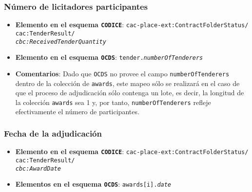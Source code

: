         \subsubsection{Número de licitadores participantes}
            \begin{itemize}
                \item \textbf{Elemento en el esquema \texttt{CODICE}}:
                    \tabto{7.6cm} \texttt{cac-place-ext:ContractFolderStatus/} \\
                    \tabto{7.6cm} \texttt{cac:TenderResult/} \\
                    \tabto{7.6cm} \texttt{\textit{cbc:ReceivedTenderQuantity}}
                \item \textbf{Elemento en el esquema \texttt{OCDS}}:
                    \tabto{7.6cm} \texttt{tender.\textit{numberOfTenderers}}
                \item \textbf{Comentarios}: Dado que \texttt{OCDS} no provee el campo \texttt{numberOfTenderers} dentro de la colección de \texttt{awards}, este mapeo sólo se realizará en el caso de que el proceso de adjudicación sólo contenga un lote, es decir, la longitud de la colección \texttt{awards} sea 1 y, por tanto, \texttt{numberOfTenderers} refleje efectivamente el número de participantes.
            \end{itemize}
            
        \subsubsection{Fecha de la adjudicación}
            \begin{itemize}
                \item \textbf{Elemento en el esquema \texttt{CODICE}}:
                    \tabto{7.6cm} \texttt{cac-place-ext:ContractFolderStatus/} \\
                    \tabto{7.6cm} \texttt{cac:TenderResult/} \\
                    \tabto{7.6cm} \texttt{\textit{cbc:AwardDate}}
                \item \textbf{Elementos en el esquema \texttt{OCDS}}:
                    \tabto{7.6cm} \texttt{awards[i].\textit{date}}
            \end{itemize}
            
